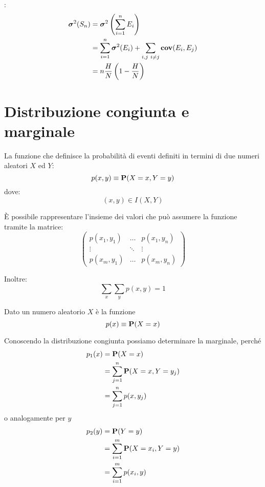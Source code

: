 :
\begin{align*}
  \var(S_n) &= \var \left(\sum_{i = 1}^n E_i\right) \\
  &= \sum_{i = 1}^n \var(E_i) + \sum_{i,j ~ i \neq j} \cov(E_i, E_j) \\ %
  &= n \frac{H}{N} \left( 1 - \frac{H}{N} \right)
\end{align*}

\section{Distribuzione congiunta e marginale} %
\begin{definition}
  \label{def:distribuzione_congiunta}
  La funzione che definisce la probabilità di eventi definiti in termini di due numeri aleatori \( X \) ed \( Y \):
  \[ p(x,y) \equiv \mathbf{P}(X = x, Y = y) \]
  dove:
  \[ (x,y) \in I(X,Y) \]
\end{definition}
È possibile rappresentare l'insieme dei valori che può assumere la funzione tramite la matrice:
\[
\begin{pmatrix}
  p(x_1, y_1) & \dots & p(x_1, y_n) \\
  \vdots & \ddots & \vdots \\
  p(x_m, y_1) & \dots & p(x_m, y_n)
\end{pmatrix}
\]

Inoltre:
\[ \sum_x \sum_y p(x,y) = 1 \]

\begin{definition}
  \label{def:distribuzione_marginale}
  Dato un numero aleatorio \( X \) è la funzione
  \[ p(x) \equiv \mathbf{P}(X = x) \]

  Conoscendo la distribuzione congiunta possiamo determinare la marginale, perché
  \begin{align*}
    p_1(x) &= \mathbf{P}(X = x) \\
    &= \sum_{j = 1}^n \mathbf{P}(X = x, Y = y_j) \\
    &= \sum_{j = 1}^n p(x, y_j)
  \end{align*}
  o analogamente per \( y \)
  \begin{align*}
    p_2(y) &= \mathbf{P}(Y = y) \\
    &= \sum_{i = 1}^m \mathbf{P}(X = x_i, Y = y) \\
    &= \sum_{i = 1}^m p(x_i, y)
  \end{align*}
\end{definition}

